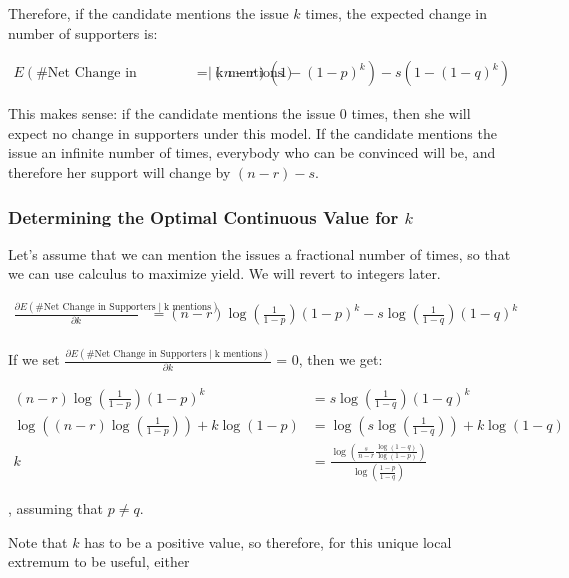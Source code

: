 \documentclass{article}
\begin{document}
Therefore, if the candidate mentions the issue $k$ times, the expected
	change in number of supporters is:

\begin{align*}
E\left( \text{\# Net Change in Supporters} \mid \text{k mentions} \right)
	& =  (n - r) \left( 1 - (1 - p)^k \right)
	- s \left( 1 - (1 - q)^k \right)
\end{align*}

This makes sense: if the candidate mentions the issue $0$ times, then she
	will expect no change in supporters under this model.
If the candidate mentions the issue an infinite number of times,
	everybody who can be convinced will be, and therefore her support
	will change by $(n-r) - s$.

\subsubsection{Determining the Optimal Continuous Value for $k$}

Let's assume that we can mention the issues a fractional number of times,	
	so that we can use calculus to maximize yield.
We will revert to integers later.

\begin{align*}
\frac{\partial 
	E\left( \text{\# Net Change in Supporters} \mid \text{k mentions} \right)}
{\partial k}
	& =  (n - r) \log \left( \frac1{1-p} \right) (1 - p)^k
	- s \log \left( \frac1{1-q} \right) (1 - q)^k \\
\end{align*}

If we set 
$\frac{\partial 
	E\left( \text{\# Net Change in Supporters} \mid \text{k mentions} \right)}
{\partial k}$ = 0, then we get:

\begin{align*}
	(n - r) \log \left( \frac1{1-p} \right) (1 - p)^k
	& =  s \log \left( \frac1{1-q} \right) (1 - q)^k \\
	\log \left( (n - r) \log \left( \frac1{1-p} \right) \right)
	+ k \log \left( 1 - p \right)
	& =  
	\log \left( s \log \left( \frac1{1-q} \right) \right)
	+ k \log \left( 1 - q \right)\\
	k & = \frac{ \log \left(
		\frac s{n-r}
		\frac{ \log \left( 1 - q \right) }
			{ \log \left( 1 - p \right) } \right) } 
	{ \log \left( \frac{1 - p}{1 - q} \right)}
\end{align*}

, assuming that $p \neq q$.

Note that $k$ has to be a positive value, so therefore,
	for this unique local extremum to be useful,
	either
\end{document}
